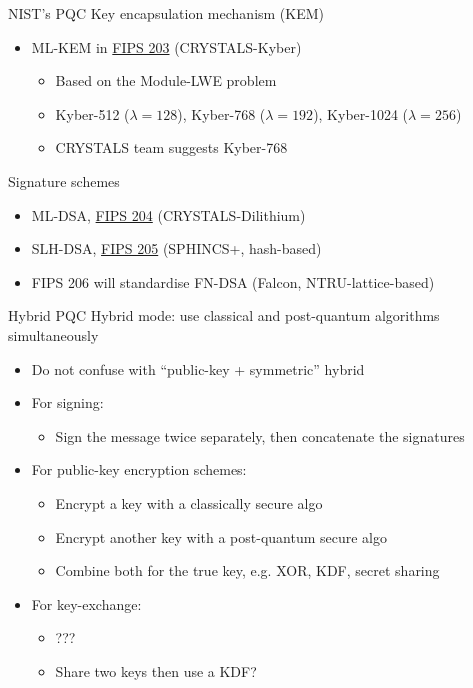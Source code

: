 \begin{frame}{NIST's PQC}
  \pause
  Key encapsulation mechanism (KEM)
  \begin{itemize}[<+(1)->]
    \item ML-KEM in \href{https://csrc.nist.gov/pubs/fips/203/final}{FIPS 203} (CRYSTALS-Kyber)
    \begin{itemize}
      \item Based on the Module-LWE problem
      \item Kyber-512 ($\lambda = 128$), Kyber-768 ($\lambda = 192$), Kyber-1024 ($\lambda = 256$)
      \item CRYSTALS team suggests Kyber-768
    \end{itemize}
  \end{itemize}

  \vspace*{1em}

  \pause
  Signature schemes
  \begin{itemize}[<+(1)->]
    \item ML-DSA, \href{https://csrc.nist.gov/pubs/fips/204/final}{FIPS 204} (CRYSTALS-Dilithium)
    \item SLH-DSA, \href{https://csrc.nist.gov/pubs/fips/205/final}{FIPS 205} (SPHINCS+, hash-based)
    \item FIPS 206 will standardise FN-DSA (Falcon, NTRU-lattice-based)
  \end{itemize}
\end{frame}

\begin{frame}{Hybrid PQC}
  \pause
  Hybrid mode: use classical and post-quantum algorithms simultaneously
  \begin{itemize}[<+(1)->]
    \item Do not confuse with \enquote{public-key + symmetric} hybrid
    \item For signing:
    \begin{itemize}
      \item Sign the message twice separately, then concatenate the signatures
    \end{itemize}
    \item For public-key encryption schemes:
    \begin{itemize}
      \item Encrypt a key with a classically secure algo
      \item Encrypt another key with a post-quantum secure algo
      \item Combine both for the true key, e.g. XOR, KDF, secret sharing
    \end{itemize}
    \item For key-exchange:
    \begin{itemize}
      \item ???
      \item Share two keys then use a KDF?
    \end{itemize}
  \end{itemize}
\end{frame}

